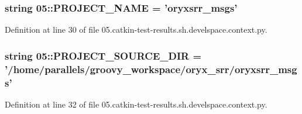 \subsubsection[{\-P\-R\-O\-J\-E\-C\-T\-\_\-\-N\-A\-M\-E}]{\setlength{\rightskip}{0pt plus 5cm}string 05\-::{\bf \-P\-R\-O\-J\-E\-C\-T\-\_\-\-N\-A\-M\-E} = 'oryxsrr\-\_\-msgs'}\label{namespace05_aaf8a7610bb62706914b392bcd3bf878a}


\-Definition at line 30 of file 05.\-catkin-\/test-\/results.\-sh.\-develspace.\-context.\-py.

\subsubsection[{\-P\-R\-O\-J\-E\-C\-T\-\_\-\-S\-O\-U\-R\-C\-E\-\_\-\-D\-I\-R}]{\setlength{\rightskip}{0pt plus 5cm}string 05\-::{\bf \-P\-R\-O\-J\-E\-C\-T\-\_\-\-S\-O\-U\-R\-C\-E\-\_\-\-D\-I\-R} = '/home/parallels/groovy\-\_\-workspace/oryx\-\_\-srr/oryxsrr\-\_\-msgs'}\label{namespace05_a0f7587cda21ed62df9ad962f7e4c202a}


\-Definition at line 32 of file 05.\-catkin-\/test-\/results.\-sh.\-develspace.\-context.\-py.

